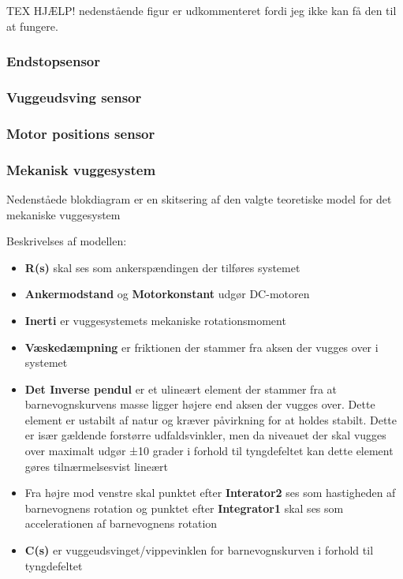 TEX HJÆLP! nedenstående figur er udkommenteret fordi jeg ikke kan få den til at fungere.

\subsubsection{Endstopsensor}

\subsubsection{Vuggeudsving sensor}

\subsubsection{Motor positions sensor}

\subsubsection{Mekanisk vuggesystem}
Nedenståede blokdiagram er en skitsering af den valgte teoretiske model for det mekaniske vuggesystem


Beskrivelses af modellen:
\begin{itemize}
\item \textbf{R(s)} skal ses som ankerspændingen der tilføres systemet
\item \textbf{Ankermodstand} og \textbf{Motorkonstant} udgør DC-motoren
\item \textbf{Inerti} er vuggesystemets mekaniske rotationsmoment
\item \textbf{Væskedæmpning} er friktionen der stammer fra aksen der vugges over i systemet
\item \textbf{Det Inverse pendul} er et ulineært element der stammer fra at barnevognskurvens masse ligger højere end aksen der vugges over. Dette element er ustabilt af natur og kræver påvirkning for at holdes stabilt. Dette er især gældende forstørre udfaldsvinkler, men da niveauet der skal vugges over maximalt udgør ±10 grader i forhold til tyngdefeltet kan dette element gøres tilnærmelsesvist lineært
\item Fra højre mod venstre skal punktet efter \textbf{Interator2} ses som hastigheden af barnevognens rotation og punktet efter \textbf{Integrator1} skal ses som accelerationen af barnevognens rotation
\item \textbf{C(s)} er vuggeudsvinget/vippevinklen for barnevognskurven i forhold til tyngdefeltet

\end{itemize}

